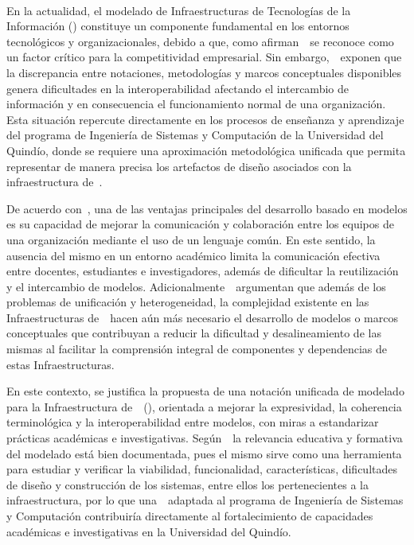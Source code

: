 \label{cap:justificacion}
\mbox{}\\

\noindent
En la actualidad, el modelado de Infraestructuras de Tecnologías de la Información (\TI) constituye un componente fundamental en los entornos tecnológicos y organizacionales, debido a que, como afirman~\cite{BROADBENT01}~se reconoce como un factor crítico para la competitividad empresarial. Sin embargo,~\cite{Jinzhi01}~exponen que la discrepancia entre notaciones, metodologías y marcos conceptuales disponibles genera dificultades en la interoperabilidad afectando el intercambio de información y en consecuencia el funcionamiento normal de una organización. Esta situación repercute directamente en los procesos de enseñanza y aprendizaje del programa de Ingeniería de Sistemas y Computación de la Universidad del Quindío, donde se requiere una aproximación metodológica unificada que permita representar de manera precisa los artefactos de diseño asociados con la infraestructura de~\TI.

De acuerdo con~\cite{Božić01}, una de las ventajas principales del desarrollo basado en modelos es su capacidad de mejorar la comunicación y colaboración entre los equipos de una organización mediante el uso de un lenguaje común. En este sentido, la ausencia del mismo en un entorno académico limita la comunicación efectiva entre docentes, estudiantes e investigadores, además de dificultar la reutilización y el intercambio de modelos. Adicionalmente~\cite{Peña01}~argumentan que además de los problemas de unificación y heterogeneidad, la complejidad existente en las Infraestructuras de~\TI~hacen aún más necesario el desarrollo de modelos o marcos conceptuales que contribuyan a reducir la dificultad y desalineamiento de las mismas al facilitar la comprensión integral de componentes y dependencias de estas Infraestructuras.

En este contexto, se justifica la propuesta de una notación unificada de modelado para la Infraestructura de~\TI~(\NDITI), orientada a mejorar la expresividad, la coherencia terminológica y la interoperabilidad entre modelos, con miras a estandarizar prácticas académicas e investigativas. Según~\cite{Henderson01}~la relevancia educativa y formativa del modelado está bien documentada, pues el mismo sirve como una herramienta para estudiar y verificar la viabilidad, funcionalidad, características, dificultades de diseño y construcción de los sistemas, entre ellos los pertenecientes a la infraestructura, por lo que una~\NDITI~adaptada al programa de Ingeniería de Sistemas y Computación contribuiría directamente al fortalecimiento de capacidades académicas e investigativas en la Universidad del Quindío.